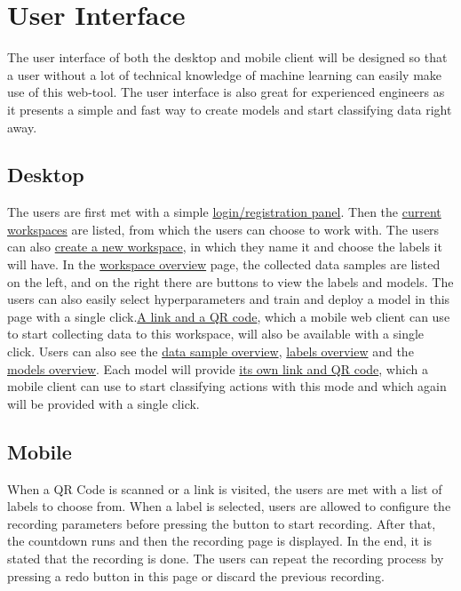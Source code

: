 \section{User Interface}
The user interface of both the desktop and mobile client will be designed so that a user without a lot of technical knowledge of machine learning can easily make use of this web-tool. The user interface is also great for experienced engineers as it presents a simple and fast way to create models and start classifying data right away.

\subsection{Desktop}
The users are first met with a simple \hyperref[fig:login]{login/registration panel}. Then the \hyperref[fig:workspaces-list]{current workspaces} are listed, from which the users can choose to work with. The users can also \hyperref[fig:create-workspace]{create a new workspace}, in which they name it and choose the labels it will have. In the \hyperref[fig:workspace-overview]{workspace overview} page, the collected data samples are listed on the left, and on the right there are buttons to view the labels and models. The users can also easily select hyperparameters and train and deploy a model in this page with a single click.\hyperref[fig:workspace-link]{A link and a QR code}, which a mobile web client can use to start collecting data to this workspace, will also be available with a single click. Users can also see the \hyperref[fig:sample-overview]{data sample overview}, \hyperref[fig:labels-overview]{labels overview} and the \hyperref[fig:models-overview]{models overview}. Each model will provide \hyperref[fig:model-link]{its own link and QR code}, which a mobile client can use to start classifying actions with this mode and which again will be provided with a single click.

\subsection{Mobile}
When a QR Code is scanned or a link is visited, the users are met with a list of labels to choose from. When a label is selected, users are allowed to configure the recording parameters before pressing the button to start recording. After that, the countdown runs and then the recording page is displayed. In the end, it is stated that the recording is done. The users can repeat the recording process by pressing a redo button in this page or discard the previous recording.

